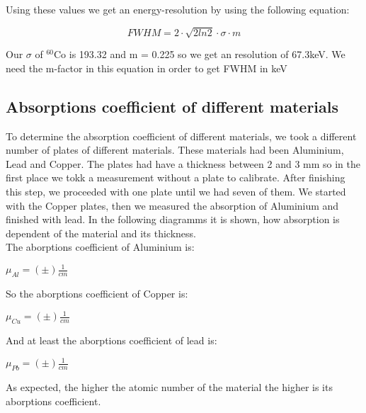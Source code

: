 
Using these values we get an energy-resolution by using the following equation:

\begin{equation}
FWHM = 2\cdot \sqrt{2 ln 2} \cdot \sigma \cdot m
\end{equation}

Our $\sigma$ of $^{60}$Co is 193.32 and m =  0.225 so we get an resolution of 67.3keV. We need the m-factor in this equation in order to get FWHM in keV

\subsection{Absorptions coefficient of different materials}
To determine the absorption coefficient of different materials, we took a different number of plates of different materials. These materials had been Aluminium, Lead and Copper. The plates had have a thickness between 2 and 3 mm so in the first place we tokk a measurement without a plate to calibrate. After finishing this step, we proceeded with one plate until we had seven of them. We started with the Copper plates, then we measured the absorption of Aluminium and finished with lead.
In the following diagramms it is shown, how absorption is dependent of the material and its thickness.\\


The aborptions coefficient of Aluminium is:
\begin{center}
$\mu_{Al} = ( \pm )\frac{1}{cm}$
\end{center}


So the aborptions coefficient of Copper is:
\begin{center}
$\mu_{Cu} = ( \pm )\frac{1}{cm}$
\end{center}


And at least the aborptions coefficient of lead is:
\begin{center}
$\mu_{Pb} = ( \pm )\frac{1}{cm}$
\end{center}

As expected, the higher the atomic number of the material the higher is its aborptions coefficient.


